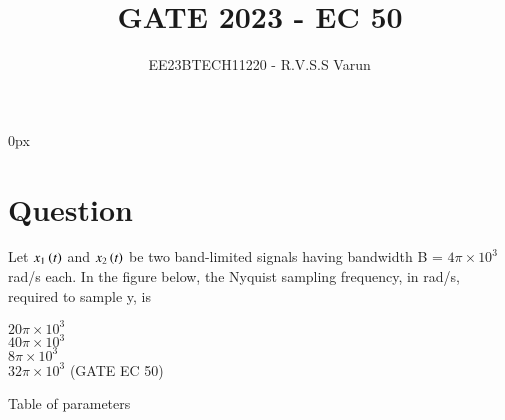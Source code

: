 \documentclass[journal,12pt,twocolumn]{IEEEtran}
\theoremstyle{remark}
\begin{document}
\parindent 0px


\title{GATE 2023 - EC 50}
\author{EE23BTECH11220 - R.V.S.S Varun$^{}$%
}
\maketitle
\newpage
\bigskip

\renewcommand{\thefigure}{\theenumi}
\renewcommand{\thetable}{\theenumi}
\section*{Question}

Let $x_1\brak{t}$ and $x_2\brak{t}$ be two band-limited signals having bandwidth B = $4\pi\times10^3$
rad/s each. In the figure below, the Nyquist sampling frequency, in
rad/s, required to sample y, is
  \\
  \vspace{25pt}
\begin{figure}[ht]
    \centering
	\begin{circuitikz}
    
	\end{circuitikz}
    \label{fig:EC50.1}
\end{figure} 

     $20\pi\times10^3$\\
     $40\pi\times10^3$\\
     $8\pi\times10^3$\\
     $32\pi\times10^3$   \hfill(GATE EC 50)\\




\fi

\begin{table}[ht]
    \centering
     
    \caption{Table of parameters}
    \label{tab:EC50.1}
\end{table}


\begin{figure}[ht]
    \centering
	
    
	
    \label{fig:EC50.2}
\end{figure} 


\begin{figure}[ht]
    \centering
	
    
	
    \label{fig:EC50.3}
\end{figure} 
\end{document}
